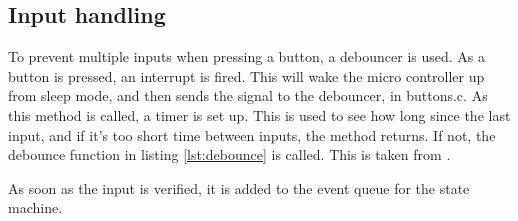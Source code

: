 \subsection{Input handling}
To prevent multiple inputs when pressing a button, a debouncer is used.
As a button is pressed, an interrupt is fired. 
This will wake the micro controller up from sleep mode, and then sends the signal to the debouncer, in buttons.c.
As this method is called, a timer is set up.
This is used to see how long since the last input, and if it's too short time between inputs, the method returns.
If not, the debounce function in listing \ref{lst:debounce} is called.
This is taken from \cite{debouncer}.



As soon as the input is verified, it is added to the event queue for the state machine.
